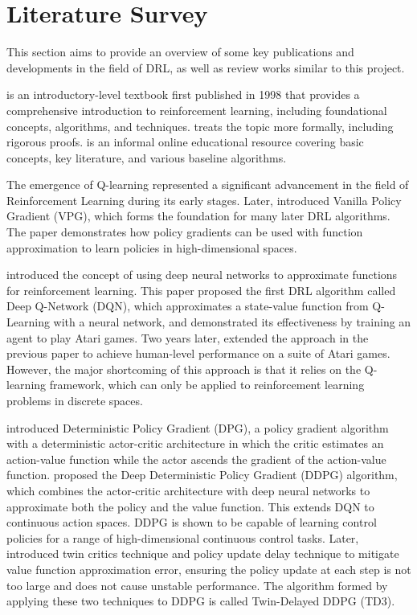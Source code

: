 \newpage
\section{Literature Survey} \label{sec:literature}

This section aims to provide an overview of some key publications and developments in the field of DRL, as well as review works similar to this project.

\cite{ref:rl-intro} is an introductory-level textbook first published in 1998 that provides a comprehensive introduction to reinforcement learning, including foundational concepts, algorithms, and techniques. \cite{ref:neuro-dp} treats the topic more formally, including rigorous proofs. \cite{ref:spinning-up} is an informal online educational resource covering basic concepts, key literature, and various baseline algorithms.

The emergence of Q-learning \cite{ref:q-learning} represented a significant advancement in the field of Reinforcement Learning during its early stages. Later, \cite{ref:fn-approx} introduced Vanilla Policy Gradient (VPG), which forms the foundation for many later DRL algorithms. The paper demonstrates how policy gradients can be used with function approximation to learn policies in high-dimensional spaces.

\cite{ref:dqn} introduced the concept of using deep neural networks to approximate functions for reinforcement learning. This paper proposed the first DRL algorithm called Deep Q-Network (DQN), which approximates a state-value function from Q-Learning with a neural network, and demonstrated its effectiveness by training an agent to play Atari games. Two years later, \cite{ref:dqn-humanlevel} extended the approach in the previous paper to achieve human-level performance on a suite of Atari games. However, the major shortcoming of this approach is that it relies on the Q-learning framework, which can only be applied to reinforcement learning problems in discrete spaces.

\cite{ref:dpg} introduced Deterministic Policy Gradient (DPG), a policy gradient algorithm with a deterministic actor-critic architecture in which the critic estimates an action-value function while the actor ascends the gradient of the action-value function. \cite{ref:ddpg} proposed the Deep Deterministic Policy Gradient (DDPG) algorithm, which combines the actor-critic architecture with deep neural networks to approximate both the policy and the value function. This extends DQN to continuous action spaces. DDPG is shown to be capable of learning control policies for a range of high-dimensional continuous control tasks. Later, \cite{ref:td3} introduced twin critics technique and policy update delay technique to mitigate value function approximation error, ensuring the policy update at each step is not too large and does not cause unstable performance. The algorithm formed by applying these two techniques to DDPG is called Twin-Delayed DDPG (TD3).

